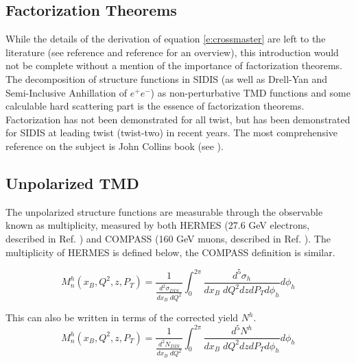 
\subsection{Factorization Theorems}
While the details of the derivation of equation \ref{e:crossmaster} are left to the literature (see reference \cite{tmds-mulders:1995} and reference \cite{tmds-bacchetta:2006} for an overview), this introduction would not be complete without a mention of the importance of factorization theorems.  The decomposition of structure functions in SIDIS (as well as Drell-Yan and Semi-Inclusive Anhillation of $e^+e^-$) as non-perturbative TMD functions and some calculable hard scattering part is the essence of factorization theorems.  Factorization has not been demonstrated for all twist, but has been demonstrated for SIDIS at leading twist (twist-two) in recent years.  The most comprehensive reference on the subject is John Collins book (see \cite{tmds-collins:2011}). 

\subsection{Unpolarized TMD}
The unpolarized structure functions are measurable through the observable known as multiplicity, measured by both HERMES (27.6 GeV electrons, described in Ref. \cite{tmds-airapetian:2012}) and COMPASS (160 GeV muons, described in Ref. \cite{tmds-aghasyan:2017}).  The multiplicity of HERMES is defined below, the COMPASS definition is similar.

\begin{equation} \label{eqn:sidis-multiplicities}
	M^{h}_{n} (x_B, Q^2, z, P_T) = \frac{1}{\frac{d^2\sigma_{DIS}}{dx_B \; dQ^2}} \int_{0}^{2\pi}  \frac{d^5\sigma_{h}}{dx_B \; dQ^2 dz dP_T d\phi_h} d\phi_h
\end{equation} 

This can also be written in terms of the corrected yield $N^h$.  
\begin{equation} 
	M^{h}_{n} (x_B, Q^2, z, P_T) = \frac{1}{\frac{d^2N_{DIS}}{dx_B \; dQ^2}} \int_{0}^{2\pi}  \frac{d^5N^h}{dx_B \; dQ^2 dz dP_T d\phi_h} d\phi_h
\end{equation} 

